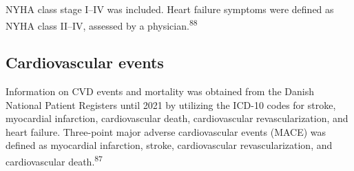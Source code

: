 \documentclass[
  a4paper,
  headsepline=true,
  open=any]{scrbook}
\begin{document}
NYHA class stage I--IV was included. Heart failure symptoms were defined
as NYHA class II--IV, assessed by a physician.\textsuperscript{88}

\hypertarget{cardiovascular-events}{%
\subsection{Cardiovascular events}\label{cardiovascular-events}}

Information on CVD events and mortality was obtained from the Danish
National Patient Registers until 2021 by utilizing the ICD-10 codes for
stroke, myocardial infarction, cardiovascular death, cardiovascular
revascularization, and heart failure. Three-point major adverse
cardiovascular events (MACE) was defined as myocardial infarction,
stroke, cardiovascular revascularization, and cardiovascular
death.\textsuperscript{87}
\end{document}
